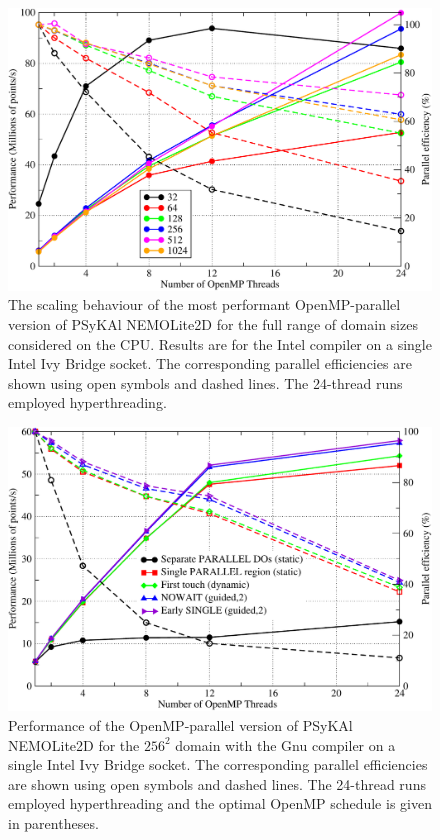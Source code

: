 \documentclass[gmd, manuscript]{copernicus}
\newlength{\picwidth}
\begin{document}
\begin{figure}
\centering
\includegraphics[width=\picwidth]{omp_scaling_problem_size}
\caption{The scaling behaviour of the most performant OpenMP-parallel
  version of {PS}y{KA}l NEMOLite2D for the full range of domain sizes
  considered on the CPU. Results are for the Intel compiler on a
  single Intel Ivy Bridge socket. The corresponding parallel
  efficiencies are shown using open symbols and dashed lines. The
  24-thread runs employed hyperthreading.}
\label{FIG_omp_domain_size}
\end{figure}

\begin{figure}
\centering
\includegraphics[width=\picwidth]{omp_scaling_256_gnu}
\caption{Performance of the OpenMP-parallel version of
  {PS}y{KA}l NEMOLite2D for the $256^2$ domain with the Gnu compiler on
  a single Intel Ivy Bridge socket. The corresponding parallel
  efficiencies are shown using open symbols and dashed lines. The
  24-thread runs employed hyperthreading and the optimal OpenMP
  schedule is given in parentheses.}
\label{FIG_gnu_omp_256}
\end{figure}
\end{document}
